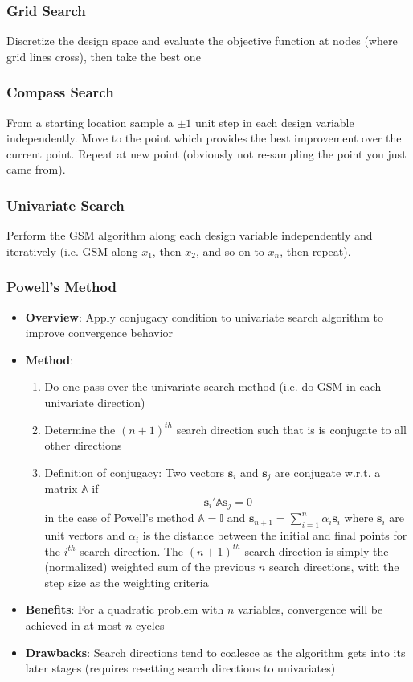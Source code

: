 \documentclass[12pt]{article}
\newcommand{\Item}[1]{\item \textbf{#1}:}
\newcommand{\sumlim}[2]{\sum\limits_{#1}^{#2}}
\begin{document}
\subsubsection{Grid Search}
Discretize the design space and evaluate the objective function at nodes (where grid lines cross), then take the best one
\subsubsection{Compass Search}
From a starting location sample a $\pm1$ unit step in each design variable independently. Move to the point which provides the best improvement over the current point. Repeat at new point (obviously not re-sampling the point you just came from).
\subsubsection{Univariate Search}
Perform the GSM algorithm along each design variable independently and iteratively (i.e. GSM along $x_1$, then $x_2$, and so on to $x_n$, then repeat).
\subsubsection{Powell's Method}
\begin{itemize}
\Item{Overview} Apply conjugacy condition to univariate search algorithm to improve convergence behavior
\Item{Method}
	\begin{enumerate}
	\item Do one pass over the univariate search method (i.e. do GSM in each univariate direction)
	\item Determine the $(n+1)^{th}$ search direction such that is is conjugate to all other directions
	\item Definition of conjugacy: Two vectors $\mathbf{s}_i$ and $\mathbf{s}_j$ are conjugate w.r.t. a matrix $\mathbb{A}$ if
	$$\mathbf{s}_i'\mathbb{A}\mathbf{s}_j=0$$
	in the case of Powell's method $\mathbb{A}=\mathbb{I}$ and $\mathbf{s}_{n+1}=\sumlim{i=1}{n}\alpha_i\mathbf{s}_i$ where $\mathbf{s}_i$ are unit vectors and $\alpha_i$ is the distance between the initial and final points for the $i^{th}$ search direction. The $(n+1)^{th}$ search direction is simply the (normalized) weighted sum of the previous $n$ search directions, with the step size as the weighting criteria
	\end{enumerate}
\Item{Benefits} For a quadratic problem with $n$ variables, convergence will be achieved in at most $n$ cycles
\Item{Drawbacks} Search directions tend to coalesce as the algorithm gets into its later stages (requires resetting search directions to univariates)
\end{itemize}
\end{document}
